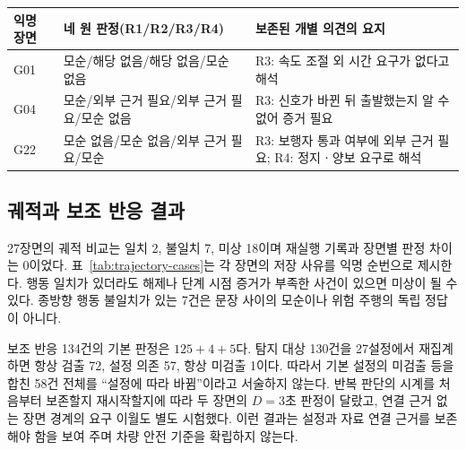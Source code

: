 \begin{revision}
\begin{table}[t]
\centering
\color{revisionblue}
\label{tab:disagreement-examples}
\scriptsize
\begin{tabularx}{\textwidth}{lL{.29\textwidth}Y}
\toprule
익명 장면 & 네 원 판정(R1/R2/R3/R4) & 보존된 개별 의견의 요지 \\
\midrule
G01 & 모순/해당 없음/해당 없음/모순 없음 & R3: 속도 조절 외 시간 요구가 없다고 해석 \\
G04 & 모순/외부 근거 필요/외부 근거 필요/모순 없음 & R3: 신호가 바뀐 뒤 출발했는지 알 수 없어 증거 필요 \\
G22 & 모순 없음/모순 없음/외부 근거 필요/모순 & R3: 보행자 통과 여부에 외부 근거 필요; R4: 정지ㆍ양보 요구로 해석 \\
\bottomrule
\end{tabularx}
\end{table}

\subsection{궤적과 보조 반응 결과}
\label{sec:trajectory-results}
27장면의 궤적 비교는 일치 2, 불일치 7, 미상 18이며 재실행 기록과 장면별 판정 차이는 0이었다. 표~\ref{tab:trajectory-cases}는 각 장면의 저장 사유를 익명 순번으로 제시한다. 행동 일치가 있더라도 해제나 단계 시점 증거가 부족한 사건이 있으면 미상이 될 수 있다. 종방향 행동 불일치가 있는 7건은 문장 사이의 모순이나 위험 주행의 독립 정답이 아니다.



보조 반응 134건의 기본 판정은 $125+4+5$다. 탐지 대상 130건을 27설정에서 재집계하면 항상 검출 72, 설정 의존 57, 항상 미검출 1이다. 따라서 기본 설정의 미검출 등을 합친 58건 전체를 ``설정에 따라 바뀜''이라고 서술하지 않는다. 반복 판단의 시계를 처음부터 보존할지 재시작할지에 따라 두 장면의 $D=3$초 판정이 달랐고, 연결 근거 없는 장면 경계의 요구 이월도 별도 시험했다. 이런 결과는 설정과 자료 연결 근거를 보존해야 함을 보여 주며 차량 안전 기준을 확립하지 않는다.
\end{revision}

